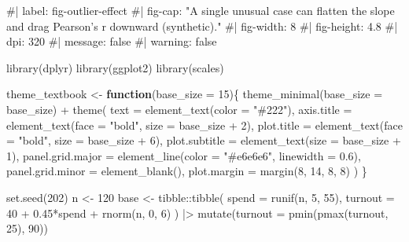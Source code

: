 \documentclass[
  letterpaper,
  DIV=11,
  numbers=noendperiod]{scrreprt}
\newenvironment{Shaded}{\begin{snugshade}}{\end{snugshade}}
\newcommand{\AttributeTok}[1]{\textcolor[rgb]{0.40,0.45,0.13}{#1}}
\newcommand{\CommentTok}[1]{\textcolor[rgb]{0.37,0.37,0.37}{#1}}
\newcommand{\ControlFlowTok}[1]{\textcolor[rgb]{0.00,0.23,0.31}{\textbf{#1}}}
\newcommand{\DecValTok}[1]{\textcolor[rgb]{0.68,0.00,0.00}{#1}}
\newcommand{\FloatTok}[1]{\textcolor[rgb]{0.68,0.00,0.00}{#1}}
\newcommand{\FunctionTok}[1]{\textcolor[rgb]{0.28,0.35,0.67}{#1}}
\newcommand{\NormalTok}[1]{\textcolor[rgb]{0.00,0.23,0.31}{#1}}
\newcommand{\OtherTok}[1]{\textcolor[rgb]{0.00,0.23,0.31}{#1}}
\newcommand{\SpecialCharTok}[1]{\textcolor[rgb]{0.37,0.37,0.37}{#1}}
\newcommand{\StringTok}[1]{\textcolor[rgb]{0.13,0.47,0.30}{#1}}
\begin{document}
\begin{Shaded}
\begin{Highlighting}[]
\CommentTok{\#| label: fig{-}outlier{-}effect}
\CommentTok{\#| fig{-}cap: "A single unusual case can flatten the slope and drag Pearson’s r downward (synthetic)."}
\CommentTok{\#| fig{-}width: 8}
\CommentTok{\#| fig{-}height: 4.8}
\CommentTok{\#| dpi: 320}
\CommentTok{\#| message: false}
\CommentTok{\#| warning: false}

\FunctionTok{library}\NormalTok{(dplyr)}
\FunctionTok{library}\NormalTok{(ggplot2)}
\FunctionTok{library}\NormalTok{(scales)}

\NormalTok{theme\_textbook }\OtherTok{\textless{}{-}} \ControlFlowTok{function}\NormalTok{(}\AttributeTok{base\_size =} \DecValTok{15}\NormalTok{)\{}
  \FunctionTok{theme\_minimal}\NormalTok{(}\AttributeTok{base\_size =}\NormalTok{ base\_size) }\SpecialCharTok{+}
    \FunctionTok{theme}\NormalTok{(}
      \AttributeTok{text =} \FunctionTok{element\_text}\NormalTok{(}\AttributeTok{color =} \StringTok{"\#222"}\NormalTok{),}
      \AttributeTok{axis.title =} \FunctionTok{element\_text}\NormalTok{(}\AttributeTok{face =} \StringTok{"bold"}\NormalTok{, }\AttributeTok{size =}\NormalTok{ base\_size }\SpecialCharTok{+} \DecValTok{2}\NormalTok{),}
      \AttributeTok{plot.title =} \FunctionTok{element\_text}\NormalTok{(}\AttributeTok{face =} \StringTok{"bold"}\NormalTok{, }\AttributeTok{size =}\NormalTok{ base\_size }\SpecialCharTok{+} \DecValTok{6}\NormalTok{),}
      \AttributeTok{plot.subtitle =} \FunctionTok{element\_text}\NormalTok{(}\AttributeTok{size =}\NormalTok{ base\_size }\SpecialCharTok{+} \DecValTok{1}\NormalTok{),}
      \AttributeTok{panel.grid.major =} \FunctionTok{element\_line}\NormalTok{(}\AttributeTok{color =} \StringTok{"\#e6e6e6"}\NormalTok{, }\AttributeTok{linewidth =} \FloatTok{0.6}\NormalTok{),}
      \AttributeTok{panel.grid.minor =} \FunctionTok{element\_blank}\NormalTok{(),}
      \AttributeTok{plot.margin =} \FunctionTok{margin}\NormalTok{(}\DecValTok{8}\NormalTok{, }\DecValTok{14}\NormalTok{, }\DecValTok{8}\NormalTok{, }\DecValTok{8}\NormalTok{)}
\NormalTok{    )}
\NormalTok{\}}

\FunctionTok{set.seed}\NormalTok{(}\DecValTok{202}\NormalTok{)}
\NormalTok{n }\OtherTok{\textless{}{-}} \DecValTok{120}
\NormalTok{base }\OtherTok{\textless{}{-}}\NormalTok{ tibble}\SpecialCharTok{::}\FunctionTok{tibble}\NormalTok{(}
  \AttributeTok{spend   =} \FunctionTok{runif}\NormalTok{(n, }\DecValTok{5}\NormalTok{, }\DecValTok{55}\NormalTok{),}
  \AttributeTok{turnout =} \DecValTok{40} \SpecialCharTok{+} \FloatTok{0.45}\SpecialCharTok{*}\NormalTok{spend }\SpecialCharTok{+} \FunctionTok{rnorm}\NormalTok{(n, }\DecValTok{0}\NormalTok{, }\DecValTok{6}\NormalTok{)}
\NormalTok{) }\SpecialCharTok{|\textgreater{}}
  \FunctionTok{mutate}\NormalTok{(}\AttributeTok{turnout =} \FunctionTok{pmin}\NormalTok{(}\FunctionTok{pmax}\NormalTok{(turnout, }\DecValTok{25}\NormalTok{), }\DecValTok{90}\NormalTok{))}


\end{Highlighting}
\end{Shaded}
\end{document}
